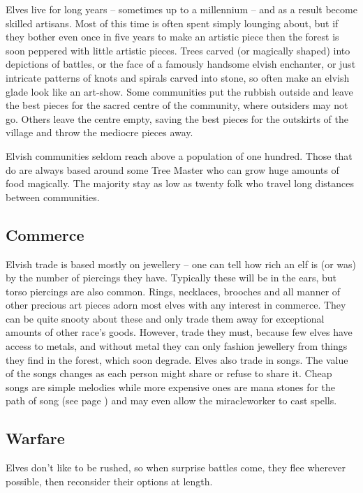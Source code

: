 \begin{multicols}{2}
Elves live for long years -- sometimes up to a millennium -- and as a result become skilled artisans.
Most of this time is often spent simply lounging about, but if they bother even once in five years to make an artistic piece then the forest is soon peppered with little artistic pieces.
Trees carved (or magically shaped) into depictions of battles, or the face of a famously handsome elvish enchanter, or just intricate patterns of knots and spirals carved into stone, so often make an elvish glade look like an art-show.
Some communities put the rubbish outside and leave the best pieces for the sacred centre of the community, where outsiders may not go.
Others leave the centre empty, saving the best pieces for the outskirts of the village and throw the mediocre pieces away.

Elvish communities seldom reach above a population of one hundred.
Those that do are always based around some Tree Master who can grow huge amounts of food magically.
The majority stay as low as twenty folk who travel long distances between communities.

\subsection{Commerce}

Elvish trade is based mostly on jewellery -- one can tell how rich an elf is (or was) by the number of piercings they have.
Typically these will be in the ears, but torso piercings are also common.
Rings, necklaces, brooches and all manner of other precious art pieces adorn most elves with any interest in commerce.
They can be quite snooty about these and only trade them away for exceptional amounts of other race's goods.
However, trade they must, because few elves have access to metals, and without metal they can only fashion jewellery from things they find in the forest, which soon degrade.
Elves also trade in songs.
The value of the songs changes as each person might share or refuse to share it.
Cheap songs are simple melodies while more expensive ones are mana stones for the path of song (see page \pageref{song}) and may even allow the \gls{miracleworker} to cast spells.

\subsection{Warfare}

Elves don't like to be rushed, so when surprise battles come, they flee wherever possible, then reconsider their options at length.


\end{multicols}
